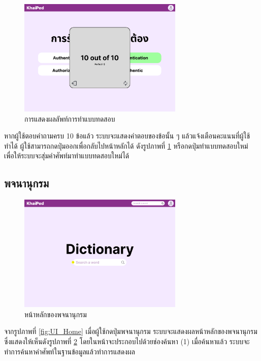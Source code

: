 \documentclass[12pt,oneside,openright,a4paper]{cpe-thai-project}
\begin{document}
\begin{figure}[!h]\centering
	\includegraphics[width=0.7\textwidth, keepaspectratio=true]{image/chap3/ui/quiz/Quiz - Result.png}
	\caption{การแสดงผลลัพท์การทำแบบทดสอบ}\label{fig:UI_QuizResult}
\end{figure}
\hspace{1cm}
หากผู้ใช้ตอบคำถามครบ 10 ข้อแล้ว ระบบจะแสดงคำตอบของข้อนั้น ๆ แล้วแจ้งเตือนคะแนนที่ผู้ใช้ทำได้ ผู้ใช้สามารถกดปุ่มออกเพื่อกลับไปหน้าหลักได้ ดังรูปภาพที่ \ref{fig:UI_QuizResult}
หรือกดปุ่มทำแบบทดสอบใหม่ เพื่อให้ระบบจะสุ่มคำศัพท์มาทำแบบทดสอบใหม่ได้

\pagebreak
\subsection{พจนานุกรม}
\begin{figure}[!h]\centering
	\includegraphics[width=0.7\textwidth, keepaspectratio=true]{image/chap3/ui/dict/Dictionary.png}
	\caption{หน้าหลักของพจนานุกรม}\label{fig:UI_Dictionary}
\end{figure}
\hspace{1cm}
จากรูปภาพที่ \ref{fig:UI_Home} เมื่อผู้ใช้กดปุ่มพจนานุกรม ระบบจะแสดงผลหน้าหลักของพจนานุกรม ซึ่งแสดงให้เห็นดังรูปภาพที่ \ref{fig:UI_Dictionary}
โดยในหน้าจะประกอบไปด้วยช่องค้นหา (1) เมื่อค้นหาแล้ว ระบบจะทำการค้นหาคำศัพท์ในฐานข้อมูลแล้วทำการแสดงผล
\end{document}
